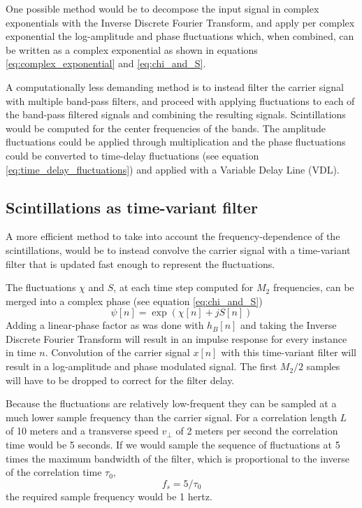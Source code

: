 One possible method would be to decompose the input signal in complex
exponentials with the Inverse Discrete Fourier Transform, and apply per complex
exponential the log-amplitude and phase fluctuations which, when combined, can be
written as a complex exponential as shown in equations
\eqref{eq:complex_exponential} and \eqref{eq:chi_and_S}.

A computationally less demanding method is to instead filter the carrier signal
with multiple band-pass filters, and proceed with applying fluctuations to each
of the band-pass filtered signals and combining the resulting signals.
Scintillations would be computed for the center frequencies of the bands. The amplitude
fluctuations could be applied through multiplication and the phase
fluctuations could be converted to time-delay fluctuations (see equation
\eqref{eq:time_delay_fluctuations}) and applied with a Variable Delay Line (VDL).


\subsection{Scintillations as time-variant filter}
A more efficient method to take into account the frequency-dependence
of the scintillations, would be to instead convolve the carrier signal with a
time-variant filter that is updated fast enough to represent the fluctuations.

The fluctuations $\chi$ and $S$, at each time step computed for $M_2$ frequencies, can be merged into a complex phase (see equation \eqref{eq:chi_and_S})
\begin{equation}
 \psi[n] = \exp\left({\chi[n] + jS[n] }\right)
\end{equation}
Adding a linear-phase factor as was done with $h_B[n]$ and taking the Inverse
Discrete Fourier Transform will result in an impulse response for every instance
in time $n$. Convolution of the carrier signal $x[n]$ with this time-variant
filter will result in a log-amplitude and phase modulated signal. The first
$M_2/2$ samples will have to be dropped to correct for the filter delay.

Because the fluctuations are relatively low-frequent they can be sampled at a
much lower sample frequency than the carrier signal. For a correlation length
$L$ of 10 meters and a transverse speed $v_{\bot}$ of 2 meters per second the
correlation time would be 5 seconds. If we would sample the sequence of
fluctuations at 5 times the maximum bandwidth of the filter, which is
proportional to the inverse of the correlation time $\tau_0$,
\begin{equation}
 f_s = 5 / \tau_0
\end{equation}
the required sample frequency would be 1 hertz.

